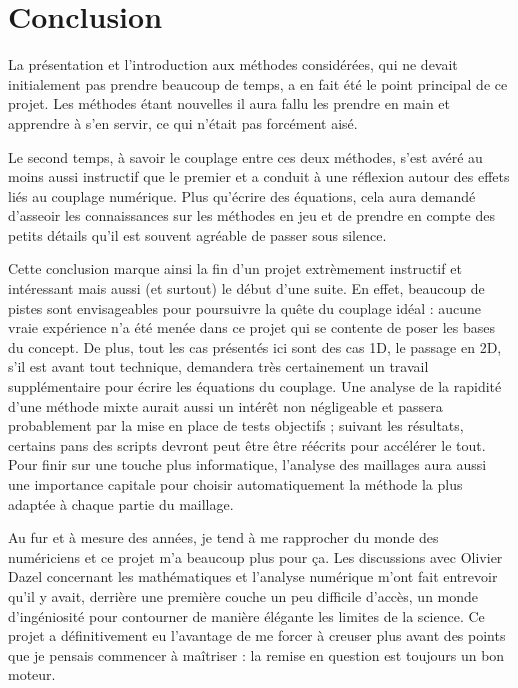\section*{Conclusion}

La présentation et l'introduction aux méthodes considérées, qui ne devait initialement pas prendre beaucoup de temps, a
en fait été le point principal de ce projet. Les méthodes étant nouvelles il aura fallu les prendre en main et apprendre
à s'en servir, ce qui n'était pas forcément aisé.

Le second temps, à savoir le couplage entre ces deux méthodes, s'est avéré au moins aussi instructif que le premier et a
conduit à une réflexion autour des effets liés au couplage numérique. Plus qu'écrire des équations, cela aura demandé
d'asseoir les connaissances sur les méthodes en jeu et de prendre en compte des petits détails qu'il est souvent
agréable de passer sous silence.

Cette conclusion marque ainsi la fin d'un projet extrèmement instructif et intéressant mais aussi (et surtout) le début d'une
suite. En effet, beaucoup de pistes sont envisageables pour poursuivre la quête du couplage idéal  : aucune vraie
expérience n'a été menée dans ce projet qui se contente de poser les bases du concept. De plus, tout les cas
présentés ici sont des cas 1D, le passage en 2D, s'il est avant tout technique, demandera très certainement un travail
supplémentaire pour écrire les équations du couplage. Une analyse de la rapidité d'une méthode mixte aurait aussi un
intérêt non négligeable et passera probablement par la mise en place de tests objectifs ; suivant les résultats,
certains pans des scripts devront peut être être réécrits pour accélérer le tout. Pour finir sur une touche plus
informatique, l'analyse des maillages aura aussi une importance capitale pour choisir automatiquement la méthode la
plus adaptée à chaque partie du maillage.

Au fur et à mesure des années, je tend à me rapprocher du monde des numériciens et ce projet m'a beaucoup plus pour ça.
Les discussions avec Olivier Dazel concernant les mathématiques et l'analyse numérique m'ont fait entrevoir qu'il y
avait, derrière une première couche un peu difficile d'accès, un monde d'ingéniosité pour contourner de manière élégante
les limites de la science. Ce projet a définitivement eu l'avantage de me forcer à creuser plus avant des points que je
pensais commencer à maîtriser : la remise en question est toujours un bon moteur.
